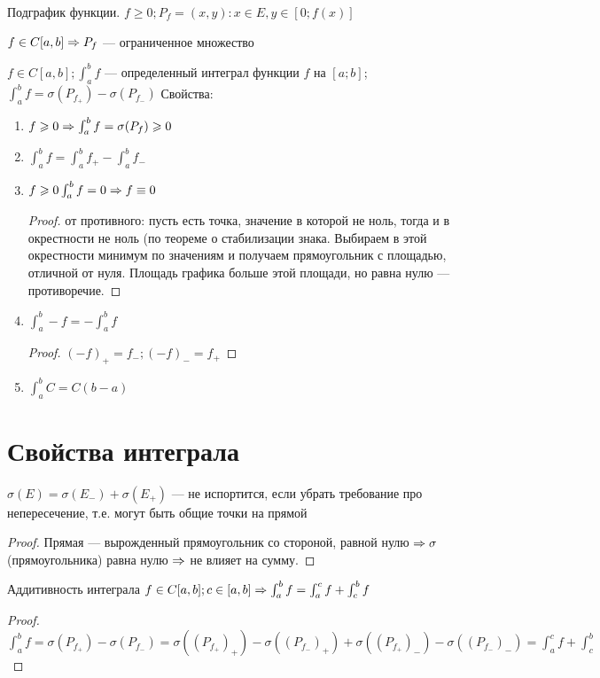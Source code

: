 \begin{Def}
Подграфик функции. $ f \geqslant 0; P_f = {(x, y): x \in E, y \in [0; f(x)]} $
\end{Def}

\begin{Rem}
$f \in C[a, b] \Rightarrow P_f $ --- ограниченное множество
\end{Rem}

\begin{Def}
$f \in C[a, b]; \int_a^b f$ --- определенный интеграл функции $ f$ на $[a; b]$; $\int_a^b f = \sigma (P_f_+) - \sigma (P_f_-) $
Свойства:
\begin{enumerate}
\item $f \geqslant 0 \Rightarrow \int_a^b f = \sigma(P_f) \geqslant 0$
\item $\int_a^b f  = \int_a^b f_+ - \int_a^b f_- $
\item $f \geqslant 0 \int_a^b f = 0 \Rightarrow f \equiv 0$
\begin{proof}
от противного: пусть есть точка, значение в которой не ноль, тогда и в окрестности не ноль (по теореме о стабилизации знака.
Выбираем в этой окрестности минимум по значениям и получаем прямоугольник с площадью, отличной от нуля.
Площадь графика больше этой площади, но равна нулю --- противоречие.
\end{proof} 
\item $\int_a^b -f = - \int_a^b f$
\begin{proof}
$(-f)_+ = f_- ; (-f)_- = f_+ $
\end{proof} 
\item $\int_a^b C = C(b - a)$
\end{enumerate}
\end{Def}

\section{Свойства интеграла}

\begin{Rem}
$ \sigma (E) = \sigma (E_-) + \sigma (E_+) $ --- не испортится, если убрать требование про непересечение, т.е. могут быть общие точки на прямой
\end{Rem}
\begin{proof}
Прямая --- вырожденный прямоугольник со стороной, равной нулю $ \Rightarrow \sigma $ (прямоугольника) равна нулю $ \Rightarrow $ не влияет на сумму.
\end{proof}

\begin{theorem}{Аддитивность интеграла}
$f \in C[a, b]; c \in [a, b] \Rightarrow \int_a^b f = \int_a^c f + \int_c^b f$
\end{theorem}
\begin{proof}
$ \int_a^b f = \sigma (P_f_+) - \sigma (P_f_-) = \sigma ((P_f_+)_+) - \sigma ((P_f_-)_+) + \sigma ((P_f_+)_-) - \sigma ((P_f_-)_-) = \int_a^c f + \int_c^b $
\end{proof}

